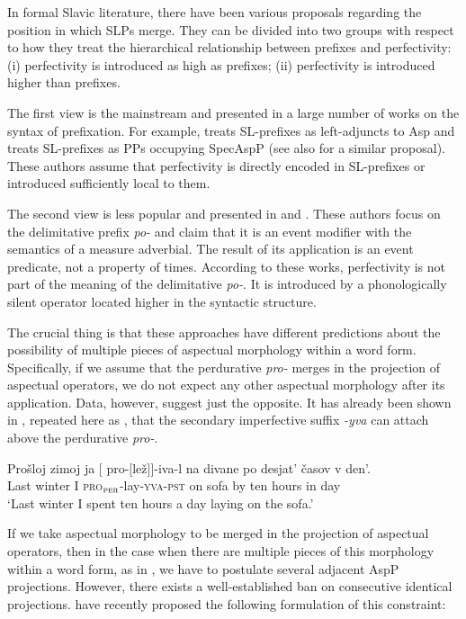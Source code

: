 \documentclass[output=paper,
]{langscibook}
\begin{document}
In formal Slavic literature, there have been various proposals regarding the position in which SLPs merge. They can be divided into two groups with respect to how they treat the hierarchical relationship between prefixes and perfectivity: (i) perfectivity is introduced as high as prefixes; (ii) perfectivity is introduced higher than prefixes.

The first view is the mainstream and presented in a large number of works on the syntax of prefixation. For example, \cite{babko1999zero} treats SL-prefixes as left-adjuncts to Asp and \cite{svenonius2004slavic} treats SL-prefixes as PPs occupying SpecAspP (see also \citealt{ramchand2005time} for a similar proposal). These authors assume that perfectivity is directly encoded in SL-prefixes or introduced sufficiently local to them.

The second view is less popular and presented in \citet{pinon1994} and \citet{filip2000quantization, filip2005measures,filip2008events}. These authors focus on the delimitative prefix \textit{po-} and claim that it is an event modifier with the semantics of a measure adverbial. The result of its application is an event predicate, not a property of times. According to these works, perfectivity is not part of the meaning of the delimitative \textit{po-}. It is introduced by a phonologically silent operator located higher in the syntactic structure.

The crucial thing is that these approaches have different predictions about the possibility of multiple pieces of aspectual morphology within a word form. Specifically, if we assume that the perdurative \textit{pro-} merges in the projection of aspectual operators, we do not expect any other aspectual morphology after its application. Data, however, suggest just the opposite. It has already been shown in , repeated here as , that the secondary imperfective suffix \textit{-yva} can attach above the perdurative \textit{pro-}.

\ea \label{ex:naumov:19}
\gll Prošloj	zimoj	ja	[\hspace{-2pt} pro-[lež]]-iva-l	   na	divane	   po	desjat’ časov	v	den’. \\
Last	winter	I   {}	\textsc{pro}$_\textsc{per}$-lay-\textsc{yva}-\textsc{pst}	   on	sofa	   by	ten hours	in	day \\
\glt `Last winter I spent ten hours a day laying on the sofa.'
\z

\noindent If we take aspectual morphology to be merged in the projection of aspectual operators, then in the case when there are multiple pieces of this morphology within a word form, as in , we have to postulate several adjacent AspP projections. However, there exists a well-established ban on consecutive identical projections. \citet{de2018negation} have recently proposed the following formulation of this constraint:
\end{document}
